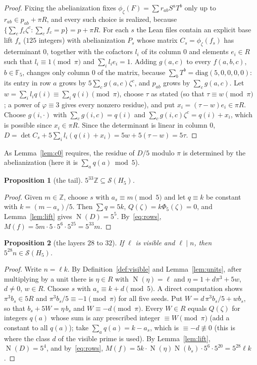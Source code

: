 \documentclass[11pt]{article}
\newtheorem{proposition}{Proposition}
\theoremstyle{definition}
\theoremstyle{remark}
\newcommand{\F}{\mathbb F_5}
\newcommand{\Z}{\mathbb Z}
\newcommand{\N}{\operatorname{N}}
\newcommand{\cS}{\mathcal S}
\begin{document}
\begin{proof}
Fixing the abelianization fixes $\phi_\zeta(F)=\sum r_{ab}S^aT^b$ only up to
$r_{ab}\in p_{ab}+\pi R$, and every such choice is realized, because
$\{\sum_c f_c\zeta^c:\sum_cf_c=p\}=p+\pi R$. For each $s$ the Lean files
contain an explicit base lift $f_s$ ($125$ integers) with abelianization $P_s$
whose matrix $C_s=\phi_\zeta(f_s)$ has determinant $0$, together with the
cofactors $l_i$ of its column $0$ and elements $e_i\in R$ such that
$l_i\equiv1\pmod\pi$ and $\sum_il_ie_i=1$. Adding $g(a,c)$ to every
$f(a,b,c)$, $b\in\F$, changes only column $0$ of the matrix, because
$\sum_bT^b=\mathrm{diag}(5,0,0,0,0)$: its entry in row $a$ grows by
$5\sum_cg(a,c)\zeta^c$, and $p_{ab}$ grows by $\sum_cg(a,c)$. Let
$w=\sum_il_iq(i)\equiv\sum_iq(i)\pmod\pi$, choose $\tau$ as stated (so that
$\tau\equiv w\pmod\pi$; a power of $\varphi\equiv3$ gives every nonzero
residue), and put $x_i=(\tau-w)e_i\in\pi R$. Choose $g(i,\cdot)$ with
$\sum_cg(i,c)=q(i)$ and $\sum_cg(i,c)\zeta^c=q(i)+x_i$, which is possible
since $x_i\in\pi R$. Since the determinant is linear in column $0$,
$D=\det C_s+5\sum_il_i(q(i)+x_i)=5w+5(\tau-w)=5\tau$.
\end{proof}

\noindent As Lemma~\ref{lem:c0} requires, the residue of $D/5$ modulo $\pi$ is
determined by the abelianization (here it is $\sum_aq(a)\bmod5$).

\begin{proposition}[the tail]\label{prop:tail}
$5^{33}\Z\subseteq\cS(H_5)$.
\end{proposition}

\begin{proof}
Given $m\in\Z$, choose $s$ with $a_s\equiv m\pmod5$ and let $q\equiv k$ be
constant with $k=(m-a_s)/5$. Then $\sum q=5k$, $Q(\zeta)=k\Phi_5(\zeta)=0$,
and Lemma~\ref{lem:lift} gives $\N(D)=5^5$. By~\eqref{eq:rows},
$M(f)=5m\cdot5\cdot5^6\cdot5^{25}=5^{33}m$.
\end{proof}

\begin{proposition}[the layers $28$ to $32$]\label{prop:low}
If $\ell$ is visible and $\ell\mid n$, then $5^{28}n\in\cS(H_5)$.
\end{proposition}

\begin{proof}
Write $n=\ell k$. By Definition~\ref{def:visible} and Lemma~\ref{lem:units},
after multiplying by a unit there is $\eta\in R$ with $\N(\eta)=\ell$ and
$\eta=1+d\pi^3+5w$, $d\ne0$, $w\in R$. Choose $s$ with $a_s\equiv k+d\pmod 5$.
A direct computation shows $\pi^3b_s\in5R$ and
$\pi^3b_s/5\equiv-1\pmod\pi$ for all five seeds. Put
$W=d\,\pi^3b_s/5+wb_s$, so that $b_s+5W=\eta\,b_s$ and $W\equiv-d\pmod\pi$.
Every $W\in R$ equals $Q(\zeta)$ for integers $q(a)$ whose sum is any
prescribed integer $\equiv W\pmod\pi$ (add a constant to all $q(a)$); take
$\sum_aq(a)=k-a_s$, which is $\equiv-d\not\equiv0$ (this is where the class
$d$ of the visible prime is used). By Lemma~\ref{lem:lift},
$\N(D)=5^4$, and by~\eqref{eq:rows},
$M(f)=5k\cdot\N(\eta)\N(b_s)\cdot5^6\cdot5^{20}=5^{28}\ell k$.
\end{proof}
\end{document}
